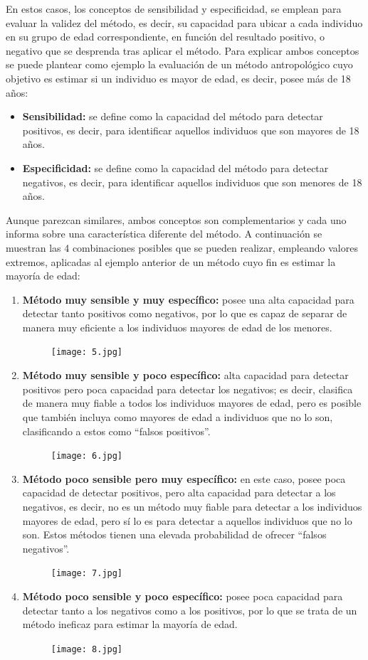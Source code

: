 \documentclass[a4paper,11pt]{article}
\begin{document}
En estos casos, los conceptos de sensibilidad y especificidad, se emplean para evaluar la validez del método, es decir, su capacidad para ubicar a cada individuo en su grupo de edad correspondiente, en función del resultado positivo, o negativo que se desprenda tras aplicar el método. Para explicar ambos conceptos se puede plantear como ejemplo la evaluación de un método antropológico cuyo objetivo es estimar si un individuo es mayor de edad, es decir, posee más de 18 años:
\begin{itemize}
\item {\bf Sensibilidad:} se define como la capacidad del método para detectar positivos, es decir, para identificar aquellos individuos que son mayores de 18 años.
\item {\bf Especificidad:} se define como la capacidad del método para detectar negativos, es decir, para identificar aquellos individuos que son menores de 18 años.
\end{itemize}
Aunque parezcan similares, ambos conceptos son complementarios y cada uno informa sobre una característica diferente del método. A continuación se muestran las 4 combinaciones posibles que se pueden realizar, empleando valores extremos, aplicadas al ejemplo anterior de un método cuyo fin es estimar la mayoría de edad:
\begin{enumerate}
\item {\bf Método muy sensible y muy específico:} posee una alta capacidad para detectar tanto positivos como negativos, por lo que es capaz de separar de manera muy eficiente a los individuos mayores de edad de los menores.
\begin{figure}[h!]
\centering
\texttt{[image: 5.jpg]}
\end{figure}
\item {\bf Método muy sensible y poco específico:} alta capacidad para detectar positivos pero poca capacidad para detectar los negativos; es decir, clasifica de manera muy fiable a todos los individuos mayores de edad, pero es posible que también incluya como mayores de edad a individuos que no lo son, clasificando a estos como “falsos positivos”.
\begin{figure}[h!]
\centering
\texttt{[image: 6.jpg]}
\end{figure}
\item {\bf Método poco sensible pero muy específico:} en este caso, posee poca capacidad de detectar positivos, pero alta capacidad para detectar a los negativos, es decir, no es un método muy fiable para detectar a los individuos mayores de edad, pero sí lo es para detectar a aquellos individuos que no lo son. Estos métodos tienen una elevada probabilidad de ofrecer “falsos negativos”.
\begin{figure}[h!]
\centering
\texttt{[image: 7.jpg]}
\end{figure}
\item {\bf Método poco sensible y poco específico:} posee poca capacidad para detectar tanto a los negativos como a los positivos, por lo que se trata de un método ineficaz para estimar la mayoría de edad.
\begin{figure}[h!]
\centering
\texttt{[image: 8.jpg]}
\end{figure}
\end{enumerate}
\end{document}
